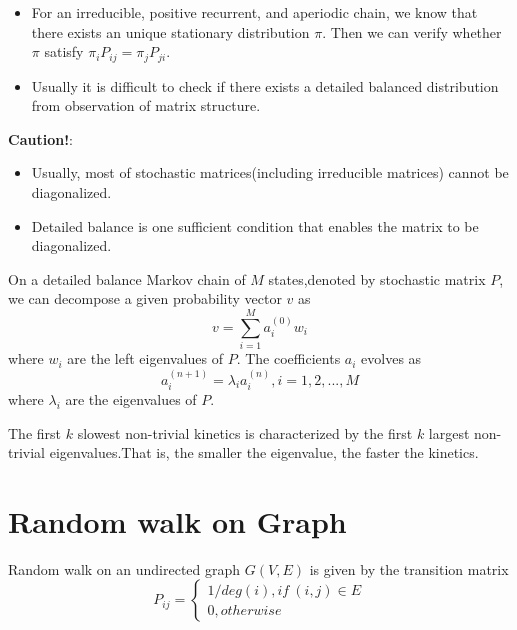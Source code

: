 \begin{refsection}
\begin{remark}\hfill
	\begin{itemize}
		\item For an irreducible, positive recurrent, and aperiodic chain, we know that there exists an unique stationary distribution $\pi$. Then we can verify whether $\pi$ satisfy $\pi_i P_{ij} = \pi_j P_{ji}$.
		\item Usually it is difficult to check if there exists a detailed balanced distribution from observation of matrix structure.
	\end{itemize}	
\end{remark}


\begin{mdframed}
\textbf{Caution!}:
\begin{itemize}
	\item Usually, most of stochastic matrices(including irreducible matrices) cannot be diagonalized.
	\item Detailed balance is one sufficient condition that enables the matrix to be diagonalized.
\end{itemize}
\end{mdframed}

\begin{corollary}
On a detailed balance Markov chain of $M$ states,denoted by stochastic matrix $P$, we can decompose a given probability vector $v$ as
$$v = \sum_{i=1}^{M} a_i^{(0)} w_i$$
where $w_i$ are the left eigenvalues of $P$. The coefficients $a_i$ evolves as
$$a_i^{(n+1)} = \lambda_i a_i^{(n)},i=1,2,...,M$$
where $\lambda_i$ are the eigenvalues of $P$.

\end{corollary}

\begin{remark}[interpretation]
The first $k$ slowest non-trivial kinetics is characterized by the first $k$ largest non-trivial eigenvalues.That is, the smaller the eigenvalue, the faster the kinetics.	
\end{remark}


\section{Random walk on Graph}
\begin{definition}
Random walk on an undirected graph $G(V,E)$ is given by the transition matrix $$P_{ij} = \begin{cases}
1/deg(i), if ~ (i,j)\in E\\
0, otherwise
\end{cases}$$
\end{definition}


\end{refsection}
